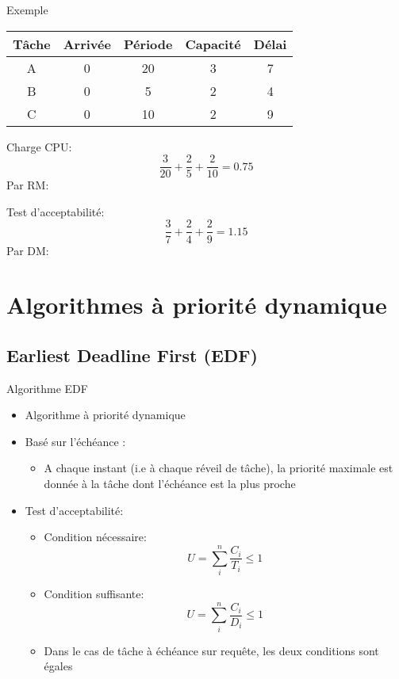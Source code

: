 \begin{frame}{Exemple}
  \begin{center}
    \begin{tabular}{ccccc}
      \hline
      Tâche & Arrivée & Période & Capacité & Délai \\
      \hline
      A & 0 & 20 & 3 & 7\\
      B & 0 &  5 & 2 & 4\\
      C & 0 & 10 & 2 & 9\\
      \hline
    \end{tabular}
  \end{center}
  \begin{overprint}
    Charge CPU:
    $$\frac{3}{20} + \frac{2}{5} + \frac{2}{10} = 0.75$$
    Par RM:
    \begin{center}
      
    \end{center}
    Test d'acceptabilité:
    $$\frac{3}{7} + \frac{2}{4} + \frac{2}{9} = 1.15$$
    Par DM:
    \begin{center}
      
    \end{center}
  \end{overprint}
\end{frame}

\section{Algorithmes à priorité dynamique}

\subsection{Earliest Deadline First (EDF)}

\begin{frame}{Algorithme EDF}
  \begin{itemize}
  \item Algorithme à priorité dynamique
  \item Basé sur l'échéance :
    \begin{itemize}
    \item A chaque instant (i.e à chaque réveil de tâche), la priorité
      maximale  est donnée  à la  tâche  dont l'échéance  est la  plus
      proche
    \end{itemize}
  \item Test d'acceptabilité:
    \begin{itemize}
    \item Condition nécessaire:
      $$U = \sum_i^n \frac{C_i}{T_i} ≤ 1$$
    \item Condition suffisante:
      $$U = \sum_i^n \frac{C_i}{D_i} ≤ 1$$
    \item  Dans le  cas  de tâche  à  échéance sur  requête, les  deux
      conditions sont égales
    \end{itemize}
  \end{itemize}
\end{frame}

